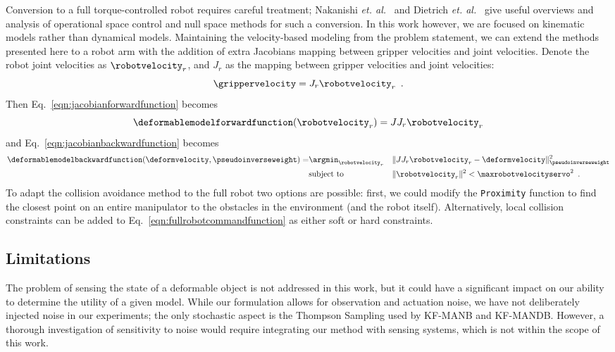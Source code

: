 Conversion to a full torque-controlled robot requires careful treatment; Nakanishi \textit{et. al.}~\cite{Nakanishi2008} and Dietrich \textit{et. al.}~\cite{Dietrich2015} give useful overviews and analysis of operational space control and null space methods for such a conversion. In this work however, we are focused on kinematic models rather than dynamical models. Maintaining the velocity-based modeling from the problem statement, we can extend the methods presented here to a robot arm with the addition of extra Jacobians mapping between gripper velocities and joint velocities. Denote the robot joint velocities as $\robotvelocity_r$, and $J_r$ as the mapping between gripper velocities and joint velocities:
\begin{equation}
    \grippervelocity = J_r \robotvelocity_r \enspace.
\end{equation}
Then Eq.~\eqref{eqn:jacobianforwardfunction} becomes
\begin{equation}
    \deformablemodelforwardfunction(\robotvelocity_r) = J J_r \robotvelocity_r
\end{equation}
and Eq.~\eqref{eqn:jacobianbackwardfunction} becomes
\begin{equation}
    \begin{aligned}
    \deformablemodelbackwardfunction(\deformvelocity, \pseudoinverseweight) =
                & \argmin_{\robotvelocity_r} 
                & & \| J J_r \robotvelocity_r - \deformvelocity \|^2_{\pseudoinverseweight} \\
                &\text{subject to}           
                & & \| \robotvelocity_r \|^2 < \maxrobotvelocityservo^2 \enspace.
\end{aligned}
\label{eqn:fullrobotcommandfunction}
\end{equation}
To adapt the collision avoidance method to the full robot two options are possible: first, we could modify the \texttt{Proximity} function to find the closest point on an entire manipulator to the obstacles in the environment (and the robot itself). Alternatively, local collision constraints can be added to Eq.~\eqref{eqn:fullrobotcommandfunction} as either soft or hard constraints.

\subsection{Limitations}

The problem of sensing the state of a deformable object is not addressed in this work, but it could have a significant impact on our ability to determine the utility of a given model. While our formulation allows for observation and actuation noise, we have not deliberately injected noise in our experiments; the only stochastic aspect is the Thompson Sampling used by KF-MANB and KF-MANDB. However, a thorough investigation of sensitivity to noise would require integrating our method with sensing systems, which is not within the scope of this work.


